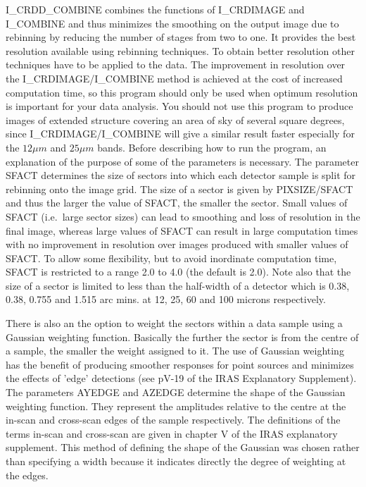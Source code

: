     I\_CRDD\_COMBINE combines the functions of I\_CRDIMAGE and I\_COMBINE and 
thus minimizes the smoothing on the output image due to rebinning by reducing
the number of stages from two to one. It provides the best
resolution available using rebinning techniques. To obtain
better resolution other techniques have to be applied to the data. The
improvement in resolution over the I\_CRDIMAGE/I\_COMBINE method is achieved at
the cost of increased computation time, so this program should only be used when
optimum resolution is important for your data analysis. You should not use
this program to produce images of extended structure covering an area of
sky of several square degrees, since I\_CRDIMAGE/I\_COMBINE will give a similar
result faster especially for the $12\mu m$ and $25\mu m$ bands.
   Before describing how to run the program, an explanation of the purpose of
some of the parameters is necessary. The parameter SFACT determines the size of
sectors into which each detector sample is split for rebinning onto the image
grid. The size of a sector is given by PIXSIZE/SFACT and thus the larger the
value of SFACT, the smaller the sector. Small values of SFACT (i.e.\ large
sector sizes) can lead to smoothing and loss of resolution in the final image,
whereas large values of SFACT can result in large computation times with no
improvement in resolution over images produced with smaller values of SFACT.
To allow some flexibility, but to avoid inordinate computation time, SFACT is
restricted to a range 2.0 to 4.0 (the default is 2.0). Note also that the size
of a sector is limited to less than the half-width of a detector which is
0.38, 0.38, 0.755 and 1.515 arc mins. at 12, 25, 60 and 100 microns 
respectively.


    There is also an the option to weight the sectors within a data
sample using a Gaussian weighting function. Basically the further the sector is
from the centre of a sample, the smaller the weight assigned to it. The use
of Gaussian weighting has the benefit of producing smoother responses for
point sources and minimizes the effects of 'edge' detections (see pV-19 of
the IRAS Explanatory Supplement). The parameters AYEDGE and AZEDGE determine
the shape of the Gaussian weighting function. They represent the amplitudes
relative to the centre at the in-scan and cross-scan edges of the sample
respectively. The definitions of the terms in-scan and cross-scan are given in
chapter V of the IRAS explanatory supplement. This method of defining the shape
of the Gaussian was chosen rather than specifying a width because it indicates 
directly the degree of weighting at the edges. 

